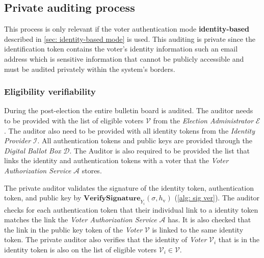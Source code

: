 \subsection{Private auditing process} \label{sec: private auditing process}
This process is only relevant if the voter authentication mode \textbf{identity-based} described in \cref{sec: identity-based mode} is used. This auditing is private since the identification token contains the voter's identity information such an email address which is sensitive information that cannot be publicly accessible and must be audited privately within the system's borders.


\subsubsection{Eligibility verifiability}
During the post-election the entire bulletin board is audited. The auditor needs to be provided with the list of eligible voters $\boldsymbol{\mathcal{V}}$ from the \textit{Election Administrator} $\mathcal{E}$. The auditor also need to be provided with all identity tokens from the \textit{Identity Provider} $\mathcal{I}$. All authentication tokens and public keys are provided through the \textit{Digital Ballot Box} $\mathcal{D}$. The Auditor is also required to be provided the list that links the identity and authentication tokens with a voter that the \textit{Voter Authorization Service} $\mathcal{A}$ stores. 

The private auditor validates the signature of the identity token, authentication token, and public key by \( \mathbf{VerifySignature}_{Y_i} (\sigma, h_\mathrm{v}) \) (\cref{alg: sig ver}). The auditor checks for each authentication token that their individual link to a identity token matches the link the \textit{Voter Authorization Service} $\mathcal{A}$ has. It is also checked that the link in the public key token of the \textit{Voter} $\mathcal{V}$ is linked to the same identity token. The private auditor also verifies that the identity of \textit{Voter} $\mathcal{V}_i$ that is in the identity token is also on the list of eligible voters $\mathcal{V}_i \in \boldsymbol{\mathcal{V}}$. 
